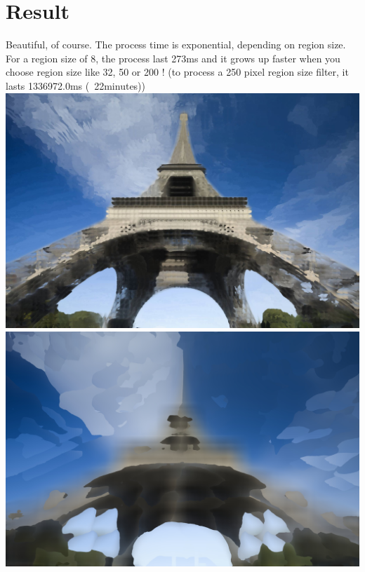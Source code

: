 \documentclass{article}
\begin{document}
\section{Result}    
Beautiful, of course.
The process time is exponential, depending on region size. For a region size of 8, the process last 273ms and it grows up faster when you choose region size like 32, 50 or 200 ! (to process a 250 pixel region size filter, it lasts 1336972.0ms (~22minutes))
\newline
\includegraphics[width=\textwidth]{labwork10-gpu-out.jpg}
\newline
\includegraphics[width=\textwidth]{labwork10-gpu-out-250regionsize.jpg}

\end{document}
